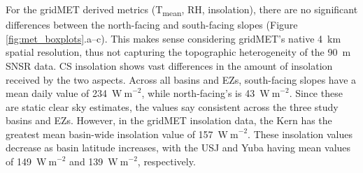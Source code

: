 For the gridMET derived metrics (T\textsubscript{mean}, RH, insolation), there are no significant differences between the north-facing and south-facing slopes (Figure \ref{fig:met_boxplots}.a--c). This makes sense considering gridMET's native 4~km spatial resolution, thus not capturing the topographic heterogeneity of the 90~m SNSR data. CS insolation shows vast differences in the amount of insolation received by the two aspects. Across all basins and EZs, south-facing slopes have a mean daily value of 234~$\mathrm{W~m}^{-2}$, while north-facing's is 43~$\mathrm{W~m}^{-2}$. Since these are static clear sky estimates, the values say consistent across the three study basins and EZs. However, in the gridMET insolation data, the Kern has the greatest mean basin-wide insolation value of 157~$\mathrm{W~m}^{-2}$. These insolation values decrease as basin latitude increases, with the USJ and Yuba having mean values of 149~$\mathrm{W~m}^{-2}$ and 139~$\mathrm{W~m}^{-2}$, respectively.

